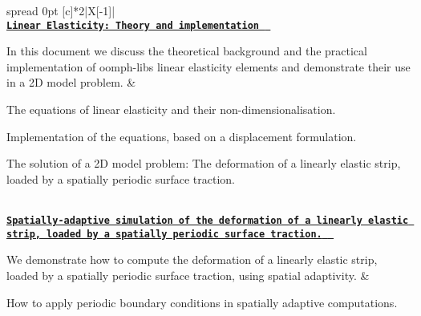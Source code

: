 \begin{longtabu} spread 0pt [c]{*{2}{|X[-1]}|}
\hline
{}\\
\href{../../linear_elasticity/periodic_load/html/index.html}{\tt {\bfseries Linear Elasticity\+: Theory and implementation } }

In this document we discuss the theoretical background and the practical implementation of {\ttfamily oomph-\/lib\textquotesingle{}s} linear elasticity elements and demonstrate their use in a 2D model problem.  &
\begin{DoxyItemize}
\item The equations of linear elasticity and their non-\/dimensionalisation.
\item Implementation of the equations, based on a displacement formulation.
\item The solution of a 2D model problem\+: The deformation of a linearly elastic strip, loaded by a spatially periodic surface traction.
\end{DoxyItemize}

\\
\href{../../linear_elasticity/refineable_periodic_load/html/index.html}{\tt {\bfseries Spatially-\/adaptive simulation of the deformation of a linearly elastic strip, loaded by a spatially periodic surface traction. } }

We demonstrate how to compute the deformation of a linearly elastic strip, loaded by a spatially periodic surface traction, using spatial adaptivity.  &
\begin{DoxyItemize}
\item How to apply periodic boundary conditions in spatially adaptive computations. 
\end{DoxyItemize}



\\
\end{longtabu}
